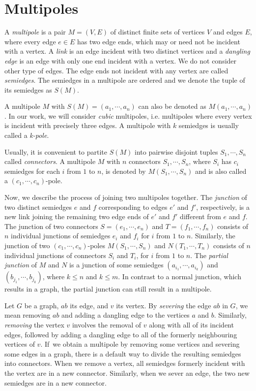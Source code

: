 \section{Multipoles}
\label{sec:multipoles}

A \textit{multipole} is a pair $M=(V,E)$ of distinct finite sets of vertices $V$ and edges $E$, where every edge $e\in E$ has two edge ends, which may or need not be incident with a vertex. A \emph{link} is an edge incident with two distinct vertices and a \emph{dangling edge} is an edge with only one end incident with a vertex. We do not consider other type of edges. The edge ends not incident with any vertex are called \textit{semiedges}. The semiedges in a multipole are ordered and we denote the tuple of its semiedges as $S(M)$.

A multipole $M$ with $S(M) = (a_1, \cdots, a_n)$ can also be denoted as $M(a_1,\cdots,a_n)$. In our work, we will consider \textit{cubic} multipoles, i.e. multipoles where every vertex is incident with precisely three edges. 
A multipole with $k$ semiedges is usually called a \textit{k-pole}. 

Usually, it is convenient to partite $S(M)$ into pairwise disjoint tuples $S_1,\cdots, S_n$ called \textit{connectors}.
A multipole $M$ with $n$ connectors $S_1,\cdots,S_n$, where $S_i$ has $c_i$ semiedges for each $i$ from $1$ to $n$, is denoted by $M(S_1,\cdots,S_n)$ and is also called a $(c_1,\cdots,c_n)$-pole.

Now, we describe the process of joining two multipoles together.
The \textit{junction} of two distinct semiedges $e$ and $f$ corresponding to edges $e'$ and $f'$, respectively, is a new link joining the remaining two edge ends of $e'$ and $f'$ different from $e$ and $f$.
The junction of two connectors $S=(e_1,\cdots,e_n)$ and $T=(f_1,\cdots,f_n)$ consists of $n$ individual junctions of semiedges $e_i$ and $f_i$ for $i$ from $1$ to $n$.
Similarly, the junction of two $(c_1,\cdots,c_n)$-poles $M(S_1,\cdots,S_n)$ and $N(T_1,\cdots,T_n)$ consists of $n$ individual junctions of connectors $S_i$ and $T_i$, for $i$ from $1$ to $n$.
The \textit{partial junction} of $M$ and $N$ is a junction of some semiedges $(a_{i_1},\cdots, a_{i_k})$ and $(b_{j_1},\cdots, b_{j_k})$, where $k\leq n$ and $k\leq m$. In contrast to a normal junction, which results in a graph, the partial junction can still result in a multipole.

Let $G$ be a graph, $ab$ its edge, and $v$ its vertex. By \textit{severing} the edge $ab$ in $G$, we mean removing $ab$ and adding a dangling edge to the vertices $a$ and $b$. Similarly, \textit{removing} the vertex $v$ involves the removal of $v$ along with all of its incident edges, followed by adding a dangling edge to all of the formerly neighbouring vertices of $v$. If~we obtain a multipole by removing some vertices and severing some edges in a graph, there is a default way to divide the resulting semiedges into connectors. When we remove a vertex, all semiedges formerly incident with the vertex are in a new connector. Similarly, when we sever an edge, the two new semiedges are in a new connector.

